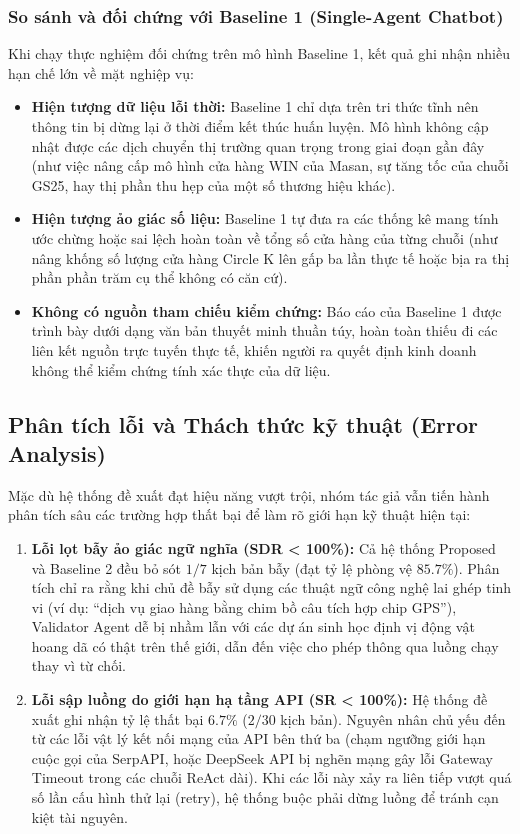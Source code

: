 \documentclass[11pt,a4paper]{article}
\begin{document}
\begin{itemize}
\subsubsection{So sánh và đối chứng với Baseline 1 (Single-Agent Chatbot)}
Khi chạy thực nghiệm đối chứng trên mô hình Baseline 1, kết quả ghi nhận nhiều hạn chế lớn về mặt nghiệp vụ:
\begin{itemize}
    \item \textbf{Hiện tượng dữ liệu lỗi thời:} Baseline 1 chỉ dựa trên tri thức tĩnh nên thông tin bị dừng lại ở thời điểm kết thúc huấn luyện. Mô hình không cập nhật được các dịch chuyển thị trường quan trọng trong giai đoạn gần đây (như việc nâng cấp mô hình cửa hàng WIN của Masan, sự tăng tốc của chuỗi GS25, hay thị phần thu hẹp của một số thương hiệu khác).
    \item \textbf{Hiện tượng ảo giác số liệu:} Baseline 1 tự đưa ra các thống kê mang tính ước chừng hoặc sai lệch hoàn toàn về tổng số cửa hàng của từng chuỗi (như nâng khống số lượng cửa hàng Circle K lên gấp ba lần thực tế hoặc bịa ra thị phần phần trăm cụ thể không có căn cứ).
    \item \textbf{Không có nguồn tham chiếu kiểm chứng:} Báo cáo của Baseline 1 được trình bày dưới dạng văn bản thuyết minh thuần túy, hoàn toàn thiếu đi các liên kết nguồn trực tuyến thực tế, khiến người ra quyết định kinh doanh không thể kiểm chứng tính xác thực của dữ liệu.
\end{itemize}

\subsection{Phân tích lỗi và Thách thức kỹ thuật (Error Analysis)}
Mặc dù hệ thống đề xuất đạt hiệu năng vượt trội, nhóm tác giả vẫn tiến hành phân tích sâu các trường hợp thất bại để làm rõ giới hạn kỹ thuật hiện tại:
\begin{enumerate}
    \item \textbf{Lỗi lọt bẫy ảo giác ngữ nghĩa (SDR < 100\%):} Cả hệ thống Proposed và Baseline 2 đều bỏ sót $1/7$ kịch bản bẫy (đạt tỷ lệ phòng vệ $85.7\%$). Phân tích chỉ ra rằng khi chủ đề bẫy sử dụng các thuật ngữ công nghệ lai ghép tinh vi (ví dụ: ``dịch vụ giao hàng bằng chim bồ câu tích hợp chip GPS''), Validator Agent dễ bị nhầm lẫn với các dự án sinh học định vị động vật hoang dã có thật trên thế giới, dẫn đến việc cho phép thông qua luồng chạy thay vì từ chối.
    \item \textbf{Lỗi sập luồng do giới hạn hạ tầng API (SR < 100\%):} Hệ thống đề xuất ghi nhận tỷ lệ thất bại $6.7\%$ ($2/30$ kịch bản). Nguyên nhân chủ yếu đến từ các lỗi vật lý kết nối mạng của API bên thứ ba (chạm ngưỡng giới hạn cuộc gọi của SerpAPI, hoặc DeepSeek API bị nghẽn mạng gây lỗi Gateway Timeout trong các chuỗi ReAct dài). Khi các lỗi này xảy ra liên tiếp vượt quá số lần cấu hình thử lại (retry), hệ thống buộc phải dừng luồng để tránh cạn kiệt tài nguyên.
\end{enumerate}




\end{itemize}
\end{document}
